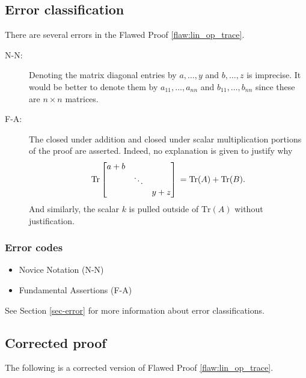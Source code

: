 \clearpage
\subsection{Error classification}


There are several errors
 in the Flawed Proof \ref{flaw:lin_op_trace}. %


 \begin{description}
 	\item[N-N:] Denoting the matrix diagonal entries by $a,\ldots,y$ and $b,\ldots, z$ is imprecise. It would be better to denote them by $a_{11}, \ldots, a_{nn}$ and $b_{11},\ldots,b_{nn}$ since these are $n\times n$ matrices.
 
  \item[F-A:] The closed under addition and closed under scalar multiplication portions of the proof are asserted. Indeed, no explanation is given to justify why \[\text{Tr} \begin{bmatrix}
    a+b & & \\
    & \ddots & \\
    & & y+z
  \end{bmatrix} \\
  = \text{Tr}(A) + \text{Tr}(B).\] And similarly, the scalar $k$ is pulled outside of $\mathrm{Tr}(A)$ without justification.
 \end{description}


\subsubsection{Error codes}
\begin{itemize}
	\item Novice Notation (N-N)
	\item   Fundamental Assertions (F-A)
\end{itemize}
See Section \ref{sec-error} for more information about error classifications.

\clearpage
\subsection{Corrected proof}

The following is a corrected version of Flawed Proof \ref{flaw:lin_op_trace}. %

